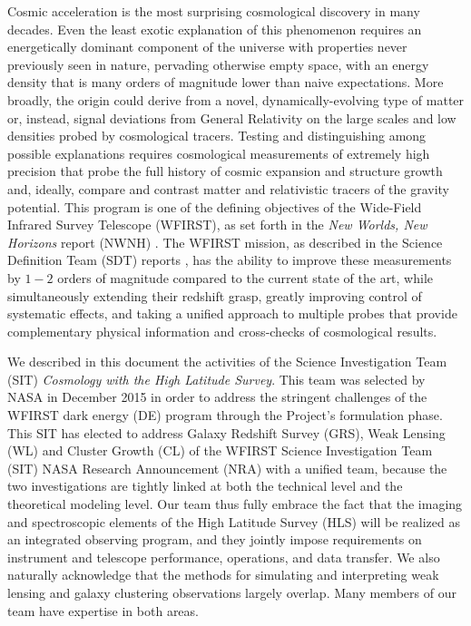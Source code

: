 %
%

\begin{summary}

Cosmic acceleration is the most surprising cosmological discovery in
many decades.  Even the least exotic explanation of this phenomenon
requires an energetically dominant component of the universe with
properties never previously seen in nature, pervading otherwise
empty space, with an energy density that is many orders of magnitude
lower than naive expectations. More broadly, the origin could derive from a novel, dynamically-evolving type of matter or, instead, signal deviations from General Relativity on the large scales and low densities probed by cosmological tracers. Testing and distinguishing among possible  explanations requires cosmological
measurements of extremely high precision that probe the full history of
cosmic expansion and structure growth and, ideally, compare and contrast matter and relativistic tracers of the gravity potential.
This program is one of the defining objectives of the Wide-Field
Infrared Survey Telescope (WFIRST), as set forth in the {\it New Worlds, New Horizons}
report (NWNH) \cite{NWNH2010}.  The WFIRST mission, as described in the Science
Definition Team (SDT) reports \citep[hereafter SDT13 and SDT15 respectively]{Spergel2013, Spergel2015}, has the ability to improve these
measurements by $1-2$ orders of magnitude compared to the current
state of the art, while simultaneously extending their redshift grasp,
greatly improving control of systematic effects, and taking a unified
approach to multiple probes that provide complementary physical information
and cross-checks of cosmological results.

We described in this document the activities of the Science Investigation Team (SIT) \emph{Cosmology with the High Latitude Survey}.
This team was selected by NASA in December 2015 in order to address
the stringent challenges of the WFIRST dark energy (DE) program through the
Project's formulation phase.  This SIT has elected to address Galaxy Redshift Survey (GRS), Weak Lensing (WL) and Cluster Growth (CL) of the WFIRST Science Investigation Team (SIT) NASA Research Announcement (NRA) with a unified team, because the two investigations are tightly linked at both
the technical level and the theoretical modeling level. Our team thus fully embrace
the fact that the imaging and spectroscopic elements of the High Latitude Survey
(HLS) will be realized as an integrated observing program, and they jointly
impose requirements on instrument and telescope performance, operations, and
data transfer. We also naturally acknowledge that the methods for simulating and interpreting weak lensing and
galaxy clustering observations largely overlap. Many members of our team
have expertise in both areas.


\end{summary}
